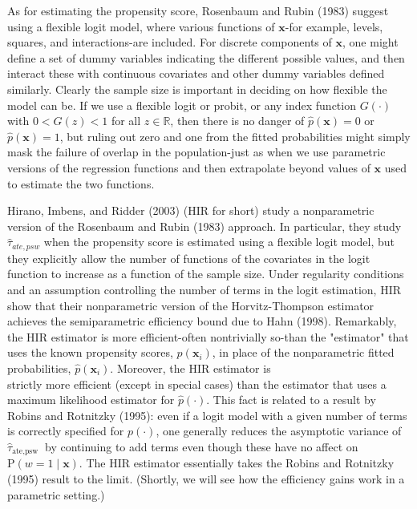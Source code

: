 \documentclass[10pt]{article}
\begin{document}
As for estimating the propensity score, Rosenbaum and Rubin (1983) suggest using a flexible logit model, where various functions of $\mathbf{x}$-for example, levels, squares, and interactions-are included. For discrete components of $\mathbf{x}$, one might define a set of dummy variables indicating the different possible values, and then interact these with continuous covariates and other dummy variables defined similarly. Clearly the sample size is important in deciding on how flexible the model can be. If we use a flexible logit or probit, or any index function $G(\cdot)$ with $0<G(z)<1$ for all $z \in \mathbb{R}$, then there is no danger of $\hat{p}(\mathbf{x})=0$ or $\hat{p}(\mathbf{x})=1$, but ruling out zero and one from the fitted probabilities might simply mask the failure of overlap in the population-just as when we use parametric versions of the regression functions and then extrapolate beyond values of $\mathbf{x}$ used to estimate the two functions.

Hirano, Imbens, and Ridder (2003) (HIR for short) study a nonparametric version of the Rosenbaum and Rubin (1983) approach. In particular, they study $\hat{\tau}_{a t e, p s w}$ when the propensity score is estimated using a flexible logit model, but they explicitly allow the number of functions of the covariates in the logit function to increase as a function of the sample size. Under regularity conditions and an assumption controlling the number of terms in the logit estimation, HIR show that their nonparametric version of the Horvitz-Thompson estimator achieves the semiparametric efficiency bound due to Hahn (1998). Remarkably, the HIR estimator is more efficient-often nontrivially so-than the "estimator" that uses the known propensity scores, $p\left(\mathbf{x}_{i}\right)$, in place of the nonparametric fitted probabilities, $\hat{p}\left(\mathbf{x}_{i}\right)$. Moreover, the HIR estimator is\\
strictly more efficient (except in special cases) than the estimator that uses a maximum likelihood estimator for $\hat{p}(\cdot)$. This fact is related to a result by Robins and Rotnitzky (1995): even if a logit model with a given number of terms is correctly specified for $p(\cdot)$, one generally reduces the asymptotic variance of $\hat{\tau}_{\text {ate,psw }}$ by continuing to add terms even though these have no affect on $\mathrm{P}(w=1 \mid \mathbf{x})$. The HIR estimator essentially takes the Robins and Rotnitzky (1995) result to the limit. (Shortly, we will see how the efficiency gains work in a parametric setting.)
\end{document}

